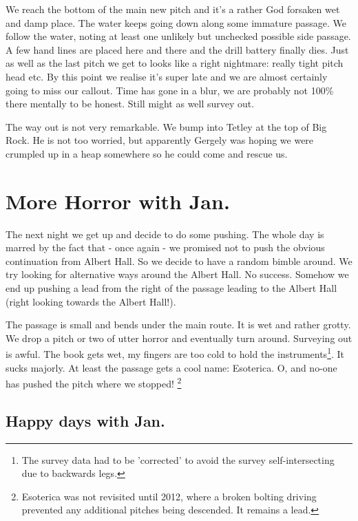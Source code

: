 We reach the bottom of the main new pitch and it's a rather God forsaken
wet and damp place. The water keeps going down along some immature
passage. We follow the water, noting at least one unlikely but unchecked
possible side passage. A few hand lines are placed here and there and
the drill battery finally dies. Just as well as the last pitch we get to
looks like a right nightmare: really tight pitch head etc. By this point
we realise it's super late and we are almost certainly going to miss our
callout. Time has gone in a blur, we are probably not 100\% there
mentally to be honest. Still might as well survey out.

The way out is not very remarkable. We bump into Tetley at the top of
Big Rock. He is not too worried, but apparently Gergely was hoping we
were crumpled up in a heap somewhere so he could come and rescue us.


\section{More Horror with Jan.}\label{more-horror-with-jan.}

The next night we get up and decide to do some pushing. The whole day is
marred by the fact that - once again - we promised not to push the
obvious continuation from Albert Hall. So we decide to have a random
bimble around. We try looking for alternative ways around the Albert
Hall. No success. Somehow we end up pushing a lead from the right of the
passage leading to the Albert Hall (right looking towards the Albert
Hall!).

The passage is small and bends under the main route. It is wet and
rather grotty. We drop a pitch or two of utter horror and eventually
turn around. Surveying out is awful. The book gets wet, my fingers are
too cold to hold the
instruments\footnote{The survey data had to be 'corrected' to avoid the survey self-intersecting due to backwards legs.}.
It sucks majorly. At least the passage gets a cool name: Esoterica. O,
and no-one has pushed the pitch where we stopped!
\footnote{Esoterica was not revisited until 2012, where a broken bolting driving prevented any additional pitches being descended. 
It remains a lead.}


\subsection{Happy days with Jan.}\label{happy-days-with-jan.}

